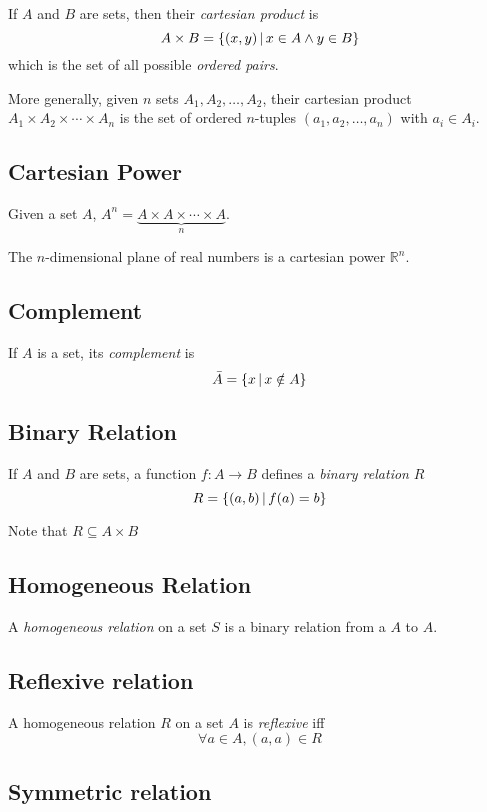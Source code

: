 \documentclass{article}
\begin{document}
If \(A\) and \(B\) are sets, then their \textit{cartesian product} is
\[
    A\times B = \{(x,y) \,|\, x \in A \land y \in B\}
\]
which is the set of all possible \textit{ordered pairs}.

More generally, given \(n\) sets \(A_1, A_2, \ldots, A_2\),
their cartesian product \(A_1 \times A_2 \times \cdots \times A_n\)
is the set of ordered \(n\)-tuples \((a_1, a_2, \ldots, a_n)\) with \(a_i\in A_i\).

\subsection{Cartesian Power}

Given a set \(A\), \(A^n=\underbrace{A\times A\times \cdots \times A}_n\).

The \(n\)-dimensional plane of real numbers is a cartesian power \({\mathbb{R}}^n\).

\subsection{Complement}

If \(A\) is a set, its \textit{complement} is
\[
    \bar{A} = \{x \,|\, x \notin A\}
\]

\subsection{Binary Relation}

If \(A\) and \(B\) are sets, a function \(f:A\to B\)
defines a \textit{binary relation} \(R\)
\[
    R = \{(a,b) \,|\, f(a)=b\}
\]

Note that \(R\subseteq A\times B\)


\subsection{Homogeneous Relation}

A \textit{homogeneous relation} on a set \(S\) is a binary relation
from a \(A\) to \(A\).

\subsection{Reflexive relation}

A homogeneous relation \(R\) on a set \(A\) is \textit{reflexive}
iff
\[
    \forall a\in A, (a,a) \in R
\]

\subsection{Symmetric relation}
\end{document}
